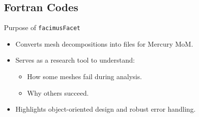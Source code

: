 % 

\subsection{Fortran Codes}
%    
%    


\begin{frame}{Purpose of \texttt{facimusFacet}}
    \begin{itemize}
        \item Converts  mesh decompositions into  files for Mercury MoM.
        \item Serves as a research tool to understand:
            \begin{itemize}
                \item How some meshes fail during analysis.
                \item Why others succeed.
            \end{itemize}
        \item Highlights object-oriented design and robust error handling.
    \end{itemize}
\end{frame}

